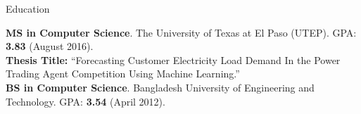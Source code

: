 \documentclass[]{mcdowellcv}
\begin{document}
    \makeheader
    
    
    \begin{cvsection}{Education}
        \begin{cvsubsection}{}{}{}
                \textbf{MS in Computer Science}. The University of Texas at El Paso (UTEP).  GPA: \textbf{3.83} (August 2016). \\
                \textbf{Thesis Title:} ``Forecasting Customer Electricity Load Demand In the Power
Trading Agent Competition Using Machine Learning.'' \\
                \textbf{BS in Computer Science}. Bangladesh University of Engineering and Technology. GPA: \textbf{3.54} (April 2012).  \\
                
        \end{cvsubsection}
    \end{cvsection}
\end{document}
